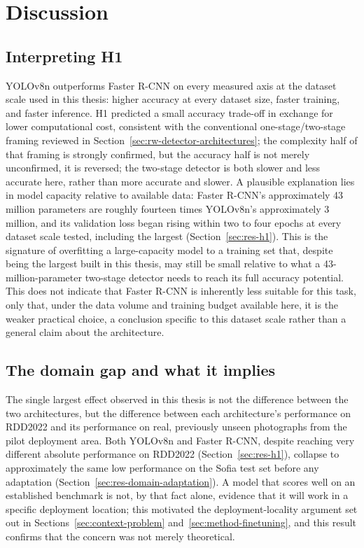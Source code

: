 \documentclass[10pt,a4paper,twocolumn]{article}
\begin{document}
\section{Discussion}
\label{sec:discussion}

\subsection{Interpreting H1}
\label{sec:disc-h1}

YOLOv8n outperforms Faster R-CNN on every measured axis at the dataset
scale used in this thesis: higher accuracy at every dataset size, faster
training, and faster inference. H1 predicted a small accuracy trade-off
in exchange for lower computational cost, consistent with the
conventional one-stage/two-stage framing reviewed in
Section~\ref{sec:rw-detector-architectures}; the complexity half of that
framing is strongly confirmed, but the accuracy half is not merely
unconfirmed, it is reversed; the two-stage detector is both slower and
less accurate here, rather than more accurate and slower. A plausible
explanation lies in model capacity relative to available data: Faster
R-CNN's approximately 43 million parameters are roughly fourteen times
YOLOv8n's approximately 3 million, and its validation loss began rising
within two to four epochs at every dataset scale tested, including the
largest (Section~\ref{sec:res-h1}). This is the signature of overfitting
a large-capacity model to a training set that, despite being the largest
built in this thesis, may still be small relative to what a
43-million-parameter two-stage detector needs to reach its full accuracy
potential. This does not indicate that Faster R-CNN is inherently less suitable
for this task, only that, under the data volume and training budget
available here, it is the weaker practical choice, a conclusion specific
to this dataset scale rather than a general claim about the architecture.

\subsection{The domain gap and what it implies}
\label{sec:disc-domain-gap}

The single largest effect observed in this thesis is not the difference
between the two architectures, but the difference between each
architecture's performance on RDD2022 and its performance on real,
previously unseen photographs from the pilot deployment area. Both
YOLOv8n and Faster R-CNN, despite reaching very different absolute
performance on RDD2022 (Section~\ref{sec:res-h1}), collapse to
approximately the same low performance on the Sofia test set before any
adaptation (Section~\ref{sec:res-domain-adaptation}). A model that scores
well on an established benchmark is not, by that fact alone, evidence
that it will work in a specific deployment location; this motivated the
deployment-locality argument set out in
Sections~\ref{sec:context-problem} and~\ref{sec:method-finetuning}, and
this result confirms that the concern was not merely theoretical.
\end{document}
